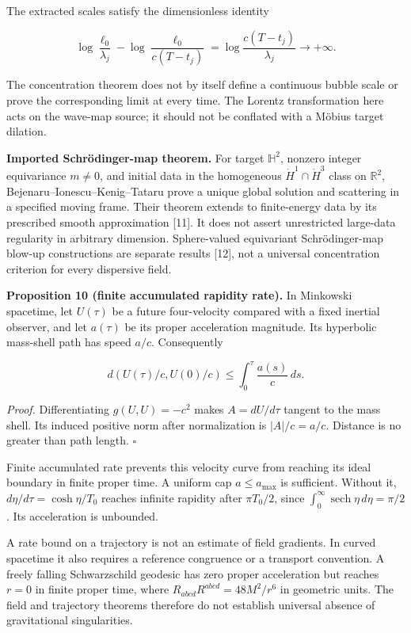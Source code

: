 \documentclass[
  11pt,
  a4paper,
]{article}
\begin{document}
The extracted scales satisfy the dimensionless identity

\[
\log\frac{\ell_0}{\lambda_j}
-\log\frac{\ell_0}{c(T-t_j)}
=\log\frac{c(T-t_j)}{\lambda_j}\longrightarrow+\infty.
\]

The concentration theorem does not by itself define a continuous bubble scale or prove the corresponding limit at every time. The Lorentz transformation here acts on the wave-map source; it should not be conflated with a Möbius target dilation.

\textbf{Imported Schrödinger-map theorem.} For target \(\mathbb H^2\), nonzero integer equivariance \(m\ne0\), and initial data in the homogeneous \(\dot H^1\cap\dot H^3\) class on \(\mathbb R^2\), Bejenaru--Ionescu--Kenig--Tataru prove a unique global solution and scattering in a specified moving frame. Their theorem extends to finite-energy data by its prescribed smooth approximation {[}11{]}. It does not assert unrestricted large-data regularity in arbitrary dimension. Sphere-valued equivariant Schrödinger-map blow-up constructions are separate results {[}12{]}, not a universal concentration criterion for every dispersive field.

\textbf{Proposition 10 (finite accumulated rapidity rate).} In Minkowski spacetime, let \(U(\tau)\) be a future four-velocity compared with a fixed inertial observer, and let \(a(\tau)\) be its proper acceleration magnitude. Its hyperbolic mass-shell path has speed \(a/c\). Consequently

\[
d(U(\tau)/c,U(0)/c)\leq\int_0^\tau\frac{a(s)}c\,ds.
\]

\emph{Proof.} Differentiating \(g(U,U)=-c^2\) makes \(A=dU/d\tau\) tangent to the mass shell. Its induced positive norm after normalization is \(|A|/c=a/c\). Distance is no greater than path length. \(\square\)

Finite accumulated rate prevents this velocity curve from reaching its ideal boundary in finite proper time. A uniform cap \(a\leq a_{\max}\) is sufficient. Without it, \(d\eta/d\tau=\cosh\eta/T_0\) reaches infinite rapidity after \(\pi T_0/2\), since \(\int_0^\infty\operatorname{sech}\eta\,d\eta=\pi/2\). Its acceleration is unbounded.

A rate bound on a trajectory is not an estimate of field gradients. In curved spacetime it also requires a reference congruence or a transport convention. A freely falling Schwarzschild geodesic has zero proper acceleration but reaches \(r=0\) in finite proper time, where \(R_{abcd}R^{abcd}=48M^2/r^6\) in geometric units. The field and trajectory theorems therefore do not establish universal absence of gravitational singularities.
\end{document}
